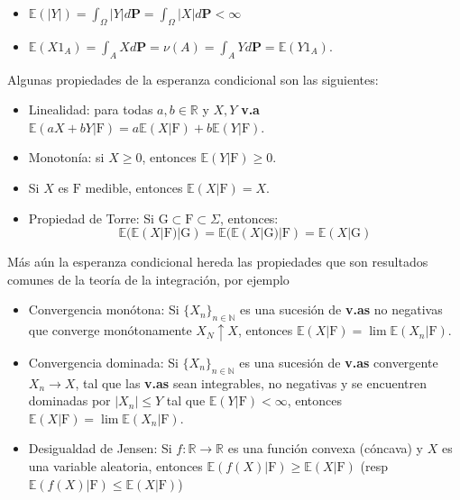 \documentclass[letterpaper]{book}
\newcommand{\nat}{\ensuremath{ \mathbb N }}
\newcommand{\prob}{\textbf{P}}
\newcommand{\esp}{\mathbb E}
\newcommand{\om}{\ensuremath{\Omega}}
\newcommand{\sig}{\ensuremath{\Sigma}}
\newcommand{\re}{\ensuremath{\mathbb R }}
\begin{document}
\begin{itemize}
\item \(\esp(|Y|)=\int_{\om}|Y|d\prob=\int_{\om}|X|d\prob<\infty\)
\item \(\esp(X1_A)=\int_{A}Xd\prob=\nu(A)=\int_{A}Yd\prob=\esp(Y1_A)\).
\end{itemize}

Algunas propiedades de la esperanza condicional son las siguientes:

\begin{itemize}
\item Linealidad: para todas \(a,b\in\re\) y \(X,Y\) \textbf{v.a} \(\esp(aX+bY|\mathrm{F})=a\esp(X|\mathrm{F})+b\esp(Y|\mathrm{F})\).
\item Monotonía: si \(X\geq0\), entonces \(\esp(Y|\mathrm{F})\geq 0\).
\item Si \(X\) es \(\mathrm{F}\) medible, entonces \(\esp(X|\mathrm{F})=X\).
\item Propiedad de Torre: Si \(\mathrm{G}\subset\mathrm{F}\subset\sig\), entonces:
\[
        \esp(\esp(X|\mathrm{F})|\mathrm{G})=\esp(\esp(X|\mathrm{G})|\mathrm{F})=\esp(X|\mathrm{G})
  \]
\end{itemize}

Más aún la esperanza condicional hereda las propiedades que son resultados comunes de la teoría de la integración, por ejemplo
\begin{itemize}
\item Convergencia monótona: Si \(\{X_n\}_{n\in\nat}\) es una sucesión de \textbf{v.as} no negativas que converge monótonamente \(X_N\uparrow X\), entonces \(\esp(X|\mathrm{F})=\lim\esp(X_n|\mathrm{F})\).
\item Convergencia dominada: Si \(\{X_n\}_{n\in\nat}\) es una sucesión de \textbf{v.as} convergente \(X_n\rightarrow X\), tal que las \textbf{v.as} sean integrables, no negativas y se encuentren dominadas por \(|X_n|\leq Y\) tal que \(\esp(Y|\mathrm{F})<\infty\),  entonces \(\esp(X|\mathrm{F})=\lim\esp(X_n|\mathrm{F})\).
\item Desigualdad de Jensen: Si \(f:\re\rightarrow\re\) es una función convexa (cóncava) y \(X\) es una variable aleatoria, entonces \(\esp(f(X)|\mathrm{F})\geq\esp(X|\mathrm{F})\) (resp \(\esp(f(X)|\mathrm{F})\leq\esp(X|\mathrm{F})\))
\end{itemize}
\end{document}
